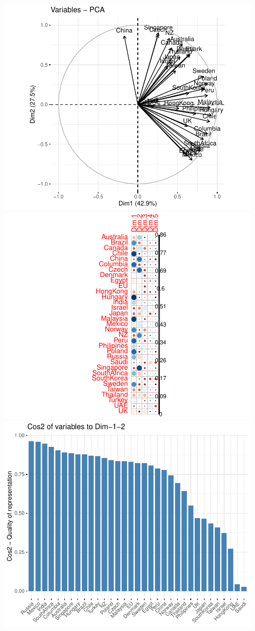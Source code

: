 \documentclass[11pt,preprint, authoryear]{elsarticle}
\numberwithin{equation}{section}
\numberwithin{figure}{section}
\numberwithin{table}{section}
\begin{document}
\includegraphics{Essay_files/figure-latex/unnamed-chunk-3-1.pdf}
\includegraphics{Essay_files/figure-latex/unnamed-chunk-3-2.pdf}
\includegraphics{Essay_files/figure-latex/unnamed-chunk-3-3.pdf}
\end{document}
